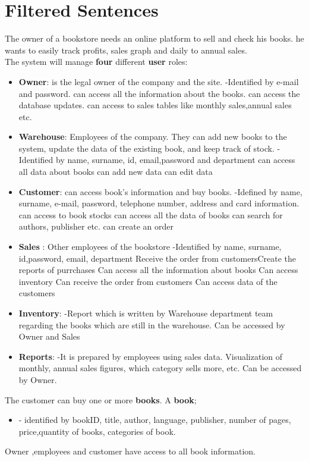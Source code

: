 \documentclass{homework}
\begin{document}
\section{Filtered Sentences}

The owner of a bookstore needs an online platform to sell and check his books. he wants to easily track profits, sales graph and daily to annual sales.\\

The system will manage \textbf{four} different \textbf{user} roles:
\begin{itemize}
    \item \textbf{Owner}: is the legal owner of the company and the site. 
     -Identified by e-mail and password.
	can access all the information about the books.
	can access the database updates.
	can access to sales tables like monthly sales,annual sales etc.

    \item \textbf{Warehouse}: Employees of the company. They can add new books to the system, update the data of the existing book, and keep track of stock.
        -Identified by name, surname, id, email,password and department
	can access all data about books
	can add new data
	can edit data

    \item \textbf{Customer}: can access book’s information and buy books.
         -Idefined by name, surname, e-mail, password, telephone number, address and card information.
	can access to book stocks
	can access all the data of books
	can search for authors, publisher etc.
	can create an order
  \item \textbf{Sales }: Other employees of the bookstore 
-Identified by name, surname, id,password, email, department
Receive the order from customersCreate the reports of purrchases 
Can access all the information about books
Can access inventory
Can receive the order from customers
Can access data of the customers
\item \textbf{Inventory}: 
   -Report which is written by Warehouse department team regarding the books which are still in the warehouse. 
Can be accessed by Owner and Sales
 \item \textbf{Reports}: 
      -It is prepared by employees using sales data. Visualization of monthly, annual sales figures, which category sells more, etc. 
Can be accessed by Owner.

\end{itemize}


\noindent The customer can buy one or more \textbf{books}. A \textbf{book};
\begin{itemize}
    \item  - identified by bookID, title, author, language, publisher, number of pages, price,quantity of books, categories of book.
    \end{itemize}
\noindent 
 Owner ,employees and customer have access to all book information.
\end{document}
